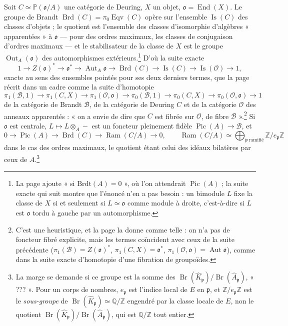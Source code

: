 \documentclass[11pt,a4paper]{article}
\begin{document}
Soit $C \simeq \mathbb{P}(\mathfrak{o}/A)$ une catégorie de Deuring, $X$ un
objet, $\mathfrak{o} = \operatorname{End}(X)$. Le groupe de Brandt
$\operatorname{Brd}(C) = \pi_{0}\operatorname{Eqv}(C)$ opère sur l'ensemble
$\operatorname{Is}(C)$ des classes d'objets ; le quotient est l'ensemble des
classes d'isomorphie d'algèbres « apparentées » à $\mathfrak{o}$ --- pour des
ordres maximaux, les classes de conjugaison d'ordres maximaux --- et le
stabilisateur de la classe de $X$ est le groupe $\operatorname{Out}_{A}
(\mathfrak{o})$ des automorphismes extérieurs.\footnote{La page ajoute « si
$\mathrm{Brdt}(A) = 0$ », où l'on attendrait $\operatorname{Pic}(A)$ ; la suite
exacte qui suit montre que l'énoncé n'en a pas besoin : un bimodule $L$ fixe la
classe de $X$ si et seulement si $L \simeq \mathfrak{o}$ comme module à droite,
c'est-à-dire si $L$ est $\mathfrak{o}$ tordu à gauche par un automorphisme.} D'où
la suite exacte
\[
  1 \to Z(\mathfrak{o})^{*} \to \mathfrak{o}^{*} \to \operatorname{Aut}_{A}
  \mathfrak{o} \to \operatorname{Brd}(C) \to \operatorname{Is}(C) \to
  \operatorname{Is}(\mathcal{O}) \to 1 ,
\]
exacte au sens des ensembles pointés pour ses deux derniers termes, que la page
récrit dans un cadre comme la suite d'homotopie
\[
  \pi_{1}(\mathcal{B}, 1) \to \pi_{1}(C, X) \to \pi_{1}(\mathcal{O}, \mathfrak{o})
  \to \pi_{0}(\mathcal{B}, 1) \to \pi_{0}(C, X) \to \pi_{0}(\mathcal{O},
  \mathfrak{o}) \to 1
\]
de la catégorie de Brandt $\mathcal{B}$, de la catégorie de Deuring $C$ et de la
catégorie $\mathcal{O}$ des anneaux apparentés : « on a envie de dire que $C$
est fibrée sur $\mathcal{O}$, de fibre $\mathcal{B}$ ».\footnote{C'est une
heuristique, et la page la donne comme telle : on n'a pas de foncteur fibré
explicite, mais les termes coïncident avec ceux de la suite précédente
($\pi_{1}(\mathcal{B}) = Z(\mathfrak{o})^{*}$, $\pi_{1}(C, X) =
\mathfrak{o}^{*}$, $\pi_{1}(\mathcal{O}, \mathfrak{o}) = \operatorname{Aut}
\mathfrak{o}$), comme dans la suite exacte d'homotopie d'une fibration de
groupoïdes.} Si $\mathfrak{o}$ est centrale, $L \mapsto L \otimes_{A} -$ est un
foncteur pleinement fidèle $\operatorname{Pic}(A) \to \mathcal{B}$, et
\[
  0 \to \operatorname{Pic}(A) \to \operatorname{Brd}(C) \to
  \operatorname{Ram}(C/A) \to 0 , \qquad \operatorname{Ram}(C/A) \simeq
  \bigoplus_{\mathfrak{p}\ \text{ramifié}} \mathbb{Z}/e_{\mathfrak{p}}\mathbb{Z}
\]
dans le cas des ordres maximaux, le quotient étant celui des idéaux bilatères
par ceux de $A$.\footnote{La marge se demande si ce groupe est la somme des
$\operatorname{Br}(\widehat{K}_{\mathfrak{p}})/\operatorname{Br}(\widehat{A}_{\mathfrak{p}})$,
« ??? ». Pour un corps de nombres, $e_{\mathfrak{p}}$ est l'indice local de $E$ en
$\mathfrak{p}$, et $\mathbb{Z}/e_{\mathfrak{p}}\mathbb{Z}$ est le
\emph{sous-groupe} de $\operatorname{Br}(\widehat{K}_{\mathfrak{p}}) \simeq
\mathbb{Q}/\mathbb{Z}$ engendré par la classe locale de $E$, non le quotient
$\operatorname{Br}(\widehat{K}_{\mathfrak{p}})/\operatorname{Br}(\widehat{A}_{\mathfrak{p}})$,
qui est $\mathbb{Q}/\mathbb{Z}$ tout entier.}
\end{document}
